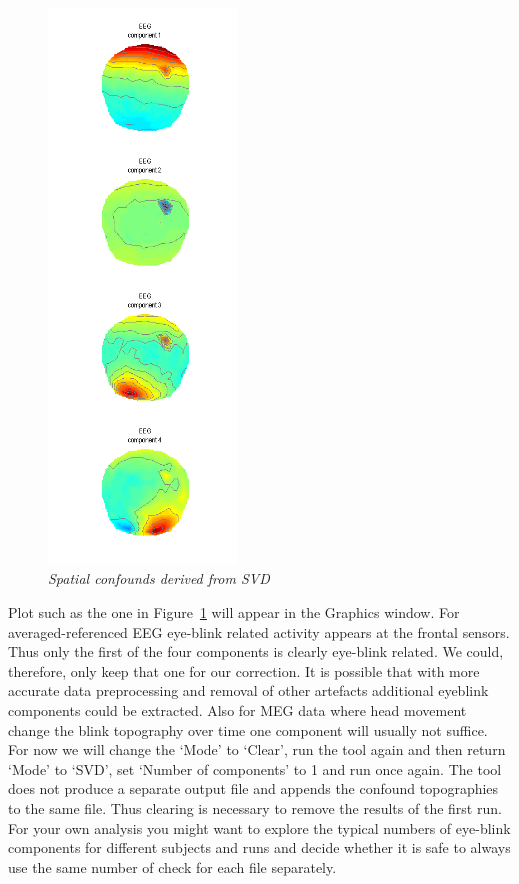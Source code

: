 \begin{figure}
\begin{center}
\includegraphics[width=50mm]{meeg_artefact/figure3}
\caption{\em Spatial confounds derived from SVD\label{artefact_fig3}}
\end{center}
\end{figure}
 
Plot such as the one in Figure~\ref{artefact_fig3} will appear in the Graphics window. For averaged-referenced EEG eye-blink related activity appears at the frontal sensors. Thus only the first of the four components is clearly eye-blink related. We could, therefore, only keep that one for our correction. It is possible that with more accurate data preprocessing and removal of other artefacts additional eyeblink components could be extracted. Also for MEG data where head movement change the blink topography over time one component will usually not suffice. For now we will change the `Mode' to `Clear', run the tool again and then return `Mode' to `SVD', set `Number of components' to 1 and run once again. The tool does not produce a separate output file and appends the confound topographies to the same file. Thus clearing is necessary to remove the results of the first run. For your own analysis you might want to explore the typical numbers of eye-blink components for different subjects and runs and decide whether it is safe to always use the same number of check for each file separately. 


